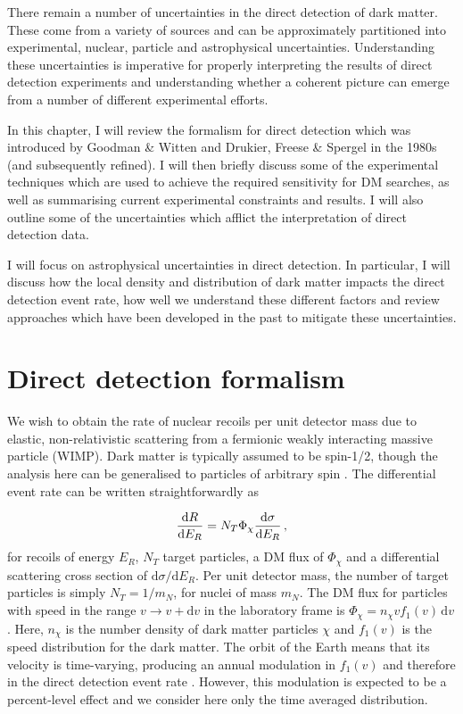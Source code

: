 There remain a number of uncertainties in the direct detection of dark matter. These come from a variety of sources and can be approximately partitioned into experimental, nuclear, particle and astrophysical uncertainties. Understanding these uncertainties is imperative for properly interpreting the results of direct detection experiments and understanding whether a coherent picture can emerge from a number of different experimental efforts.

In this chapter, I will review the formalism for direct detection which was introduced by Goodman \& Witten and Drukier, Freese \& Spergel in the 1980s (and subsequently refined). I will then briefly discuss some of the experimental techniques which are used to achieve the required sensitivity for DM searches, as well as summarising current experimental constraints and results. I will also outline some of the uncertainties which afflict the interpretation of direct detection data.

I will focus on astrophysical uncertainties in direct detection. In particular, I will discuss how the local density and distribution of dark matter impacts the direct detection event rate, how well we understand these different factors and review approaches which have been developed in the past to mitigate these uncertainties.

\section{Direct detection formalism}

We wish to obtain the rate of nuclear recoils per unit detector mass due to elastic, non-relativistic scattering from a fermionic weakly interacting massive particle (WIMP). Dark matter is typically assumed to be spin-1/2, though the analysis here can be generalised to particles of arbitrary spin \cite{Kurylov:2003}. The differential event rate can be written straightforwardly as

\begin{equation}
\frac{\mathrm{d}R}{\mathrm{d}E_R} = N_T \Phi_\chi \frac{\mathrm{d}\sigma}{\mathrm{d}E_R}\,,
\end{equation}
for recoils of energy $E_R$, $N_T$ target particles, a DM flux of $\Phi_\chi$ and a differential scattering cross section of $\mathrm{d}\sigma/\mathrm{d}E_R$. Per unit detector mass, the number of target particles is simply $N_T = 1/m_N$, for nuclei of mass $m_N$. The DM flux for particles with speed in the range $v \rightarrow v + \mathrm{d}v$ in the laboratory frame is $\Phi_\chi = n_\chi v f_1(v) \,\mathrm{d}v$. Here, $n_\chi$ is the number density of dark matter particles $\chi$ and $f_1(v)$ is the speed distribution for the dark matter. The orbit of the Earth means that its velocity is time-varying, producing an annual modulation in $f_1(v)$ and therefore in the direct detection event rate \cite{Freese:1988}. However, this modulation is expected to be a percent-level effect and we consider here only the time averaged distribution.

